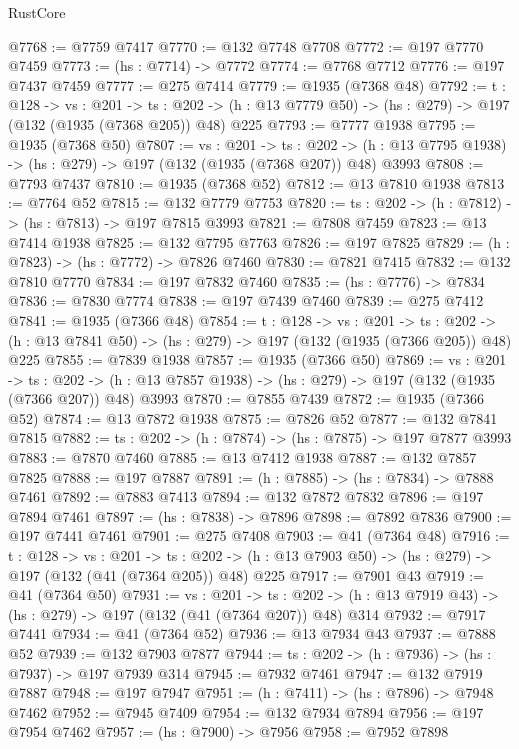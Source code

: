 \begin{lexlean}{RustCore}
\begin{coremodule}
@7768 := @7759 @7417
@7770 := @132 @7748 @7708
@7772 := @197 @7770 @7459
@7773 := (hs : @7714) -> @7772
@7774 := @7768 @7712
@7776 := @197 @7437 @7459
@7777 := @275 @7414
@7779 := @1935 (@7368 @48)
@7792 := {t : @128} ->
  {vs : @201} ->
  {ts : @202} -> (h : @13 @7779 @50) -> (hs : @279) -> @197 (@132 (@1935 (@7368 @205)) @48) @225
@7793 := @7777 @1938
@7795 := @1935 (@7368 @50)
@7807 := {vs : @201} ->
  {ts : @202} -> (h : @13 @7795 @1938) -> (hs : @279) -> @197 (@132 (@1935 (@7368 @207)) @48) @3993
@7808 := @7793 @7437
@7810 := @1935 (@7368 @52)
@7812 := @13 @7810 @1938
@7813 := @7764 @52
@7815 := @132 @7779 @7753
@7820 := {ts : @202} -> (h : @7812) -> (hs : @7813) -> @197 @7815 @3993
@7821 := @7808 @7459
@7823 := @13 @7414 @1938
@7825 := @132 @7795 @7763
@7826 := @197 @7825
@7829 := (h : @7823) -> (hs : @7772) -> @7826 @7460
@7830 := @7821 @7415
@7832 := @132 @7810 @7770
@7834 := @197 @7832 @7460
@7835 := (hs : @7776) -> @7834
@7836 := @7830 @7774
@7838 := @197 @7439 @7460
@7839 := @275 @7412
@7841 := @1935 (@7366 @48)
@7854 := {t : @128} ->
  {vs : @201} ->
  {ts : @202} -> (h : @13 @7841 @50) -> (hs : @279) -> @197 (@132 (@1935 (@7366 @205)) @48) @225
@7855 := @7839 @1938
@7857 := @1935 (@7366 @50)
@7869 := {vs : @201} ->
  {ts : @202} -> (h : @13 @7857 @1938) -> (hs : @279) -> @197 (@132 (@1935 (@7366 @207)) @48) @3993
@7870 := @7855 @7439
@7872 := @1935 (@7366 @52)
@7874 := @13 @7872 @1938
@7875 := @7826 @52
@7877 := @132 @7841 @7815
@7882 := {ts : @202} -> (h : @7874) -> (hs : @7875) -> @197 @7877 @3993
@7883 := @7870 @7460
@7885 := @13 @7412 @1938
@7887 := @132 @7857 @7825
@7888 := @197 @7887
@7891 := (h : @7885) -> (hs : @7834) -> @7888 @7461
@7892 := @7883 @7413
@7894 := @132 @7872 @7832
@7896 := @197 @7894 @7461
@7897 := (hs : @7838) -> @7896
@7898 := @7892 @7836
@7900 := @197 @7441 @7461
@7901 := @275 @7408
@7903 := @41 (@7364 @48)
@7916 := {t : @128} ->
  {vs : @201} ->
  {ts : @202} -> (h : @13 @7903 @50) -> (hs : @279) -> @197 (@132 (@41 (@7364 @205)) @48) @225
@7917 := @7901 @43
@7919 := @41 (@7364 @50)
@7931 := {vs : @201} ->
  {ts : @202} -> (h : @13 @7919 @43) -> (hs : @279) -> @197 (@132 (@41 (@7364 @207)) @48) @314
@7932 := @7917 @7441
@7934 := @41 (@7364 @52)
@7936 := @13 @7934 @43
@7937 := @7888 @52
@7939 := @132 @7903 @7877
@7944 := {ts : @202} -> (h : @7936) -> (hs : @7937) -> @197 @7939 @314
@7945 := @7932 @7461
@7947 := @132 @7919 @7887
@7948 := @197 @7947
@7951 := (h : @7411) -> (hs : @7896) -> @7948 @7462
@7952 := @7945 @7409
@7954 := @132 @7934 @7894
@7956 := @197 @7954 @7462
@7957 := (hs : @7900) -> @7956
@7958 := @7952 @7898

\end{coremodule}
\end{lexlean}
